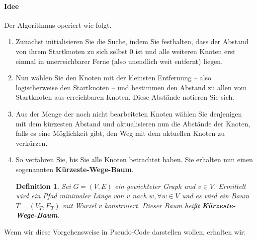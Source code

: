 \documentclass[11pt,a4paper]{scrartcl}
\newtheorem{definition}{Definition}
\begin{document}
\paragraph{Idee} Der Algorithmus operiert wie folgt.
\begin{enumerate}
\item Zunächst initialisieren Sie die Suche, indem Sie festhalten, dass der Abstand von ihrem Startknoten zu sich selbst 0 ist und alle weiteren Knoten erst einmal in unerreichbarer Ferne (also unendlich weit entfernt) liegen.
\item Nun wählen Sie den Knoten mit der kleinsten Entfernung -- also logischerweise den Startknoten -- und bestimmen den Abstand zu allen vom Startknoten aus erreichbaren Knoten. Diese Abstände notieren Sie sich.
\item Aus der Menge der noch nicht bearbeiteten Knoten wählen Sie denjenigen mit dem kürzesten Abstand und aktualisieren nun die Abstände der Knoten, falls es eine Möglichkeit gibt, den Weg mit dem aktuellen Knoten zu verkürzen.
\item So verfahren Sie, bis Sie alle Knoten betrachtet haben. Sie erhalten nun einen sogenannten \textbf{Kürzeste-Wege-Baum}.
\begin{definition}
Sei $G = (V, E)$ ein gewichteter Graph und $v \in V$. Ermittelt wird ein Pfad minimaler Länge von $v$ nach $w, \forall w \in V$ und es wird ein Baum $T = (V_T, E_T)$ mit Wurzel $v$ konstruiert. Dieser Baum heißt \textbf{Kürzeste-Wege-Baum}.
\end{definition}
\end{enumerate}
Wenn wir diese Vorgehensweise in Pseudo-Code darstellen wollen, erhalten wir:
\end{document}
